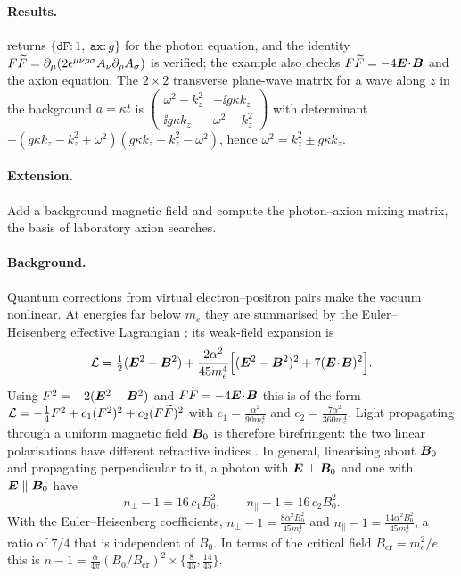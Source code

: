 \paragraph{Results.}  returns $\{\texttt{dF}:1,\ \texttt{ax}:g\}$ for the photon equation, and the identity $F\widetilde{F}=\partial_\mu(2\epsilon^{\mu\nu\rho\sigma}A_\nu\partial_\rho A_\sigma)$ is verified; the example also checks $F\widetilde{F}=-4\bm{E}\!\cdot\!\bm{B}$ and the axion equation. The $2\times2$ transverse plane-wave matrix for a wave along $z$ in the background $a=\kappa t$ is $\begin{pmatrix}\omega^2-k_z^2&-\ii g\kappa k_z\\ \ii g\kappa k_z&\omega^2-k_z^2\end{pmatrix}$ with determinant $-(g\kappa k_z-k_z^2+\omega^2)(g\kappa k_z+k_z^2-\omega^2)$, hence $\omega^2=k_z^2\pm g\kappa k_z$.

\paragraph{Extension.} Add a background magnetic field and compute the photon--axion mixing matrix, the basis of laboratory axion searches.


\paragraph{Background.} Quantum corrections from virtual electron--positron pairs make the vacuum nonlinear. At energies far below $m_e$ they are summarised by the Euler--Heisenberg effective Lagrangian \cite{EulerHeisenberg1936}; its weak-field expansion is
\begin{equation}
\mathcal L=\tfrac12(\bm{E}^2-\bm{B}^2)+\frac{2\alpha^2}{45m_e^4}\Big[(\bm{E}^2-\bm{B}^2)^2+7(\bm{E}\!\cdot\!\bm{B})^2\Big].
\end{equation}
Using $F^2=-2(\bm{E}^2-\bm{B}^2)$ and $F\widetilde{F}=-4\bm{E}\!\cdot\!\bm{B}$ this is of the form $\mathcal L=-\tfrac14F^2+c_1(F^2)^2+c_2(F\widetilde{F})^2$ with $c_1=\tfrac{\alpha^2}{90m_e^4}$ and $c_2=\tfrac{7\alpha^2}{360m_e^4}$. Light propagating through a uniform magnetic field $\bm{B}_0$ is therefore birefringent: the two linear polarisations have different refractive indices \cite{BialynickaBirula1970,Adler1971}. In general, linearising about $\bm{B}_0$ and propagating perpendicular to it, a photon with $\bm{E}\perp\bm{B}_0$ and one with $\bm{E}\parallel\bm{B}_0$ have
\begin{equation}
n_\perp-1=16\,c_1B_0^2,\qquad n_\parallel-1=16\,c_2B_0^2.
\end{equation}
With the Euler--Heisenberg coefficients, $n_\perp-1=\frac{8\alpha^2B_0^2}{45m_e^4}$ and $n_\parallel-1=\frac{14\alpha^2B_0^2}{45m_e^4}$, a ratio of $7/4$ that is independent of $B_0$. In terms of the critical field $B_{\mathrm{cr}}=m_e^2/e$ this is $n-1=\frac{\alpha}{4\pi}(B_0/B_{\mathrm{cr}})^2\times\{\frac{8}{45},\frac{14}{45}\}$.

